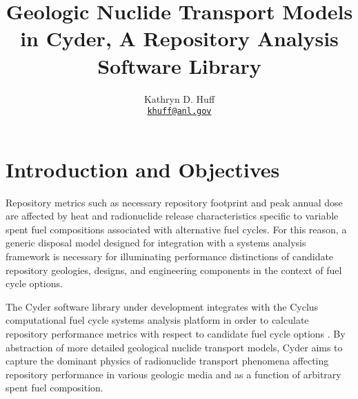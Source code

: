 \documentclass[letterpaper]{article}
\author{Kathryn D. Huff
\\ \href{mailto:khuff@anl.gov}{\texttt{khuff@anl.gov}}
}
\date{}
\title{Geologic Nuclide Transport Models in Cyder, A Repository Analysis Software Library}
\begin{document}
\maketitle





\section{Introduction and Objectives}

Repository metrics such as necessary repository footprint and peak annual dose 
are affected by heat and radionuclide release characteristics specific to 
variable spent fuel compositions associated with alternative fuel cycles.  For 
this reason, a generic disposal model designed for integration with a systems 
analysis framework is necessary for illuminating performance distinctions of 
candidate repository geologies, designs, and engineering components in the 
context of fuel cycle options. 

The Cyder software library under development integrates with 
the Cyclus computational fuel cycle systems analysis platform in order to 
calculate repository performance metrics with respect to candidate fuel cycle 
options \cite{huff_cyder_2012,huff_cyclus:_2010}. By abstraction of more 
detailed geological nuclide transport models, Cyder aims to capture the dominant 
physics of radionuclide transport phenomena affecting repository performance in 
various geologic media and as a function of arbitrary spent fuel composition.
\end{document}
